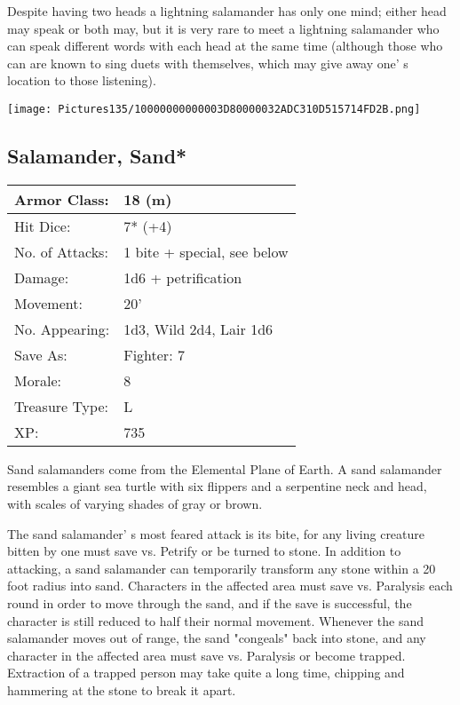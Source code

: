 \documentclass[a4paper,twoside,openany,10pt]{book}
\begin{document}
\begin{multicols}{2}
Despite having two heads a lightning salamander has only one mind; either head may speak or both may, but it is very rare to meet a lightning salamander who can speak different words with each head at the same time (although those who can are known to sing duets with themselves, which may give away one' s location to those listening).

\vfill

\begin{center} \texttt{[image: Pictures135/10000000000003D80000032ADC310D515714FD2B.png]} \end{center}


\subsection*{Salamander, Sand*}\label{salamander-sand}

\begin{tabularx}{0.50\textwidth}{@{}lX@{}}
Armor Class: & 18 (m) \\\hline
Hit Dice: & 7* (+4) \\\hline
No. of Attacks: & 1 bite + special, see below \\\hline
Damage: & 1d6 + petrification \\\hline
Movement: & 20' \\\hline
No. Appearing: & 1d3, Wild 2d4, Lair 1d6 \\\hline
Save As: & Fighter: 7 \\\hline
Morale: & 8 \\\hline
Treasure Type: & L \\\hline
XP: & 735 \\\hline
\end{tabularx}

Sand salamanders come from the Elemental Plane of Earth. A sand salamander resembles a giant sea turtle with six flippers and a serpentine neck and head, with scales of varying shades of gray or brown.

The sand salamander' s most feared attack is its bite, for any living creature bitten by one must save vs. Petrify or be turned to stone. In addition to attacking, a sand salamander can temporarily transform any stone within a 20 foot radius into sand. Characters in the affected area must save vs. Paralysis each round in order to move through the sand, and if the save is successful, the character is still reduced to half their normal movement. Whenever the sand salamander moves out of range, the sand "congeals" back into stone, and any character in the affected area must save vs. Paralysis or become trapped. Extraction of a trapped person may take quite a long time, chipping and hammering at the stone to break it apart.


\end{multicols}
\end{document}
